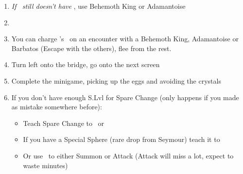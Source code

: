 \begin{enumerate}[resume]
    \item \textit{If \rikku\ still doesn't have \od} \formation{\tidus}{\auron}{\rikku}, use Behemoth King or Adamantoise
    \item \formation{\tidus}{\kimahri}{\auron}
    \item You can charge \rikku's \od\ on an encounter with a Behemoth King, Adamantoise or Barbatos (Escape with the others), flee from the rest.
    \item Turn left onto the bridge, go onto the next screen
    \item Complete the minigame, picking up the eggs and avoiding the crystals
    \item If you don't have enough S.Lvl for Spare Change (only happens if you made as mistake somewhere before):
    \begin{itemize}
        \item Teach Spare Change to \kimahri\ or \rikku
        \item If you have a Special Sphere (rare drop from Seymour) teach it to \yuna
        \item Or use \yuna\ to either Summon or Attack (Attack will miss a lot, expect to waste minutes)
    \end{itemize}
\end{enumerate}
